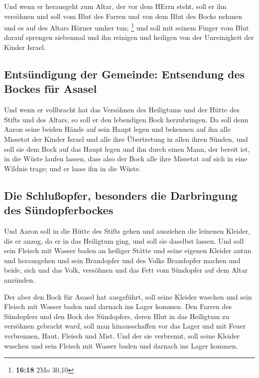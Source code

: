  Und wenn er herausgeht zum Altar, der vor dem HErrn
steht, soll er ihn versöhnen und soll vom Blut des Farren und von dem
Blut des Bocks nehmen und es auf des Altars Hörner umher tun;
\footnote{\textbf{16:18} 2Mo 30,10}  und soll mit seinem
Finger vom Blut darauf sprengen siebenmal und ihn reinigen und heiligen
von der Unreinigkeit der Kinder Israel.

\hypertarget{entsuxfcndigung-der-gemeinde-entsendung-des-bockes-fuxfcr-asasel}{%
\subsection{Entsündigung der Gemeinde: Entsendung des Bockes für
Asasel}\label{entsuxfcndigung-der-gemeinde-entsendung-des-bockes-fuxfcr-asasel}}

 Und wenn er vollbracht hat das Versöhnen des Heiligtums
und der Hütte des Stifts und des Altars, so soll er den lebendigen Bock
herzubringen.  Da soll denn Aaron seine beiden Hände auf
sein Haupt legen und bekennen auf ihn alle Missetat der Kinder Israel
und alle ihre Übertretung in allen ihren Sünden, und soll sie dem Bock
auf das Haupt legen und ihn durch einen Mann, der bereit ist, in die
Wüste laufen lassen,  dass also der Bock alle ihre
Missetat auf sich in eine Wildnis trage; und er lasse ihn in die Wüste.

\hypertarget{die-schluuxdfopfer-besonders-die-darbringung-des-suxfcndopferbockes}{%
\subsection{Die Schlußopfer, besonders die Darbringung des
Sündopferbockes}\label{die-schluuxdfopfer-besonders-die-darbringung-des-suxfcndopferbockes}}

 Und Aaron soll in die Hütte des Stifts gehen und
ausziehen die leinenen Kleider, die er anzog, da er in das Heiligtum
ging, und soll sie daselbst lassen.  Und soll sein
Fleisch mit Wasser baden an heiliger Stätte und seine eigenen Kleider
antun und herausgehen und sein Brandopfer und des Volks Brandopfer
machen und beide, sich und das Volk, versöhnen  und das
Fett vom Sündopfer auf dem Altar anzünden.

 Der aber den Bock für Asasel hat ausgeführt, soll seine
Kleider waschen und sein Fleisch mit Wasser baden und darnach ins Lager
kommen.  Den Farren des Sündopfers und den Bock des
Sündopfers, deren Blut in das Heiligtum zu versöhnen gebracht ward, soll
man hinausschaffen vor das Lager und mit Feuer verbrennen, Haut, Fleisch
und Mist.  Und der sie verbrennt, soll seine Kleider
waschen und sein Fleisch mit Wasser baden und darnach ins Lager kommen.

